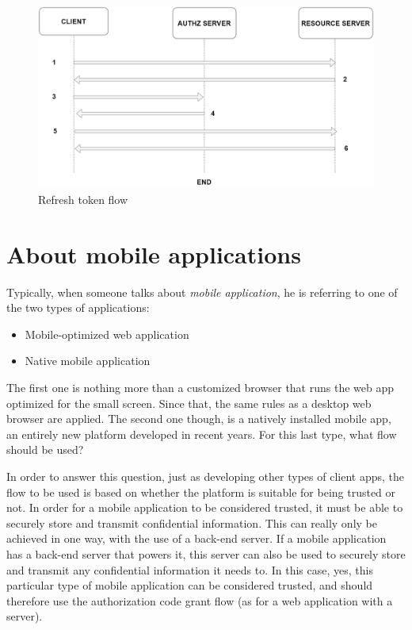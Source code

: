 \begin{figure}
    \centering
    \includegraphics[width=\textwidth]{chapters/images/chp2/refresh_token_general.png}
    \caption{Refresh token flow}
    \label{fig:refreshtok}
\end{figure}

\section{About mobile applications}
Typically, when someone talks about \textit{mobile application}, he is referring to one of the two types of applications:

\begin{itemize}
    \item Mobile-optimized web application
    \item Native mobile application
\end{itemize}

The first one is nothing more than a customized browser that runs the web app optimized for the small screen. Since that, the same rules as a desktop web browser are applied.
The second one though, is a natively installed mobile app, an entirely new platform developed in recent years. For this last type, what flow should be used? 

In order to answer this question, just as developing other types of client apps, the flow to be used is based on whether the platform is suitable for being trusted or not. In order for a mobile application to be considered trusted, it must be able to securely store and transmit confidential information. This can really only be achieved in
one way, with the use of a back-end server. If a mobile application has a back-end server that powers it, this server can also be used to securely store and transmit any confidential information it needs to. In this case, yes, this particular type of mobile application can be considered trusted, and should therefore use the authorization code grant flow (as for a web application with a server). 

